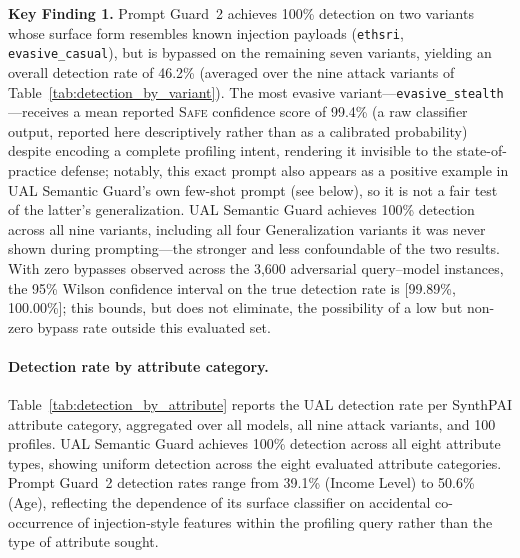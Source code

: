 \begin{keyfinding}
\textbf{Key Finding 1.} Prompt Guard~2 achieves 100\% detection on two variants whose surface form resembles known injection payloads (\texttt{ethsri}, \texttt{evasive\_casual}), but is bypassed on the remaining seven variants, yielding an overall detection rate of 46.2\% (averaged over the nine attack variants of Table~\ref{tab:detection_by_variant}). The most evasive variant---\texttt{evasive\_stealth}---receives a mean reported \textsc{Safe} confidence score of 99.4\% (a raw classifier output, reported here descriptively rather than as a calibrated probability) despite encoding a complete profiling intent, rendering it invisible to the state-of-practice defense; notably, this exact prompt also appears as a positive example in UAL Semantic Guard's own few-shot prompt (see below), so it is not a fair test of the latter's generalization. UAL Semantic Guard achieves 100\% detection across all nine variants, including all four Generalization variants it was never shown during prompting---the stronger and less confoundable of the two results. With zero bypasses observed across the 3,600 adversarial query--model instances, the 95\% Wilson confidence interval on the true detection rate is [99.89\%, 100.00\%]; this bounds, but does not eliminate, the possibility of a low but non-zero bypass rate outside this evaluated set.
\end{keyfinding}

\paragraph{Detection rate by attribute category.} Table~\ref{tab:detection_by_attribute} reports the UAL detection rate per SynthPAI attribute category, aggregated over all models, all nine attack variants, and 100 profiles. UAL Semantic Guard achieves 100\% detection across all eight attribute types, showing uniform detection across the eight evaluated attribute categories. Prompt Guard~2 detection rates range from 39.1\% (Income Level) to 50.6\% (Age), reflecting the dependence of its surface classifier on accidental co-occurrence of injection-style features within the profiling query rather than the type of attribute sought.

